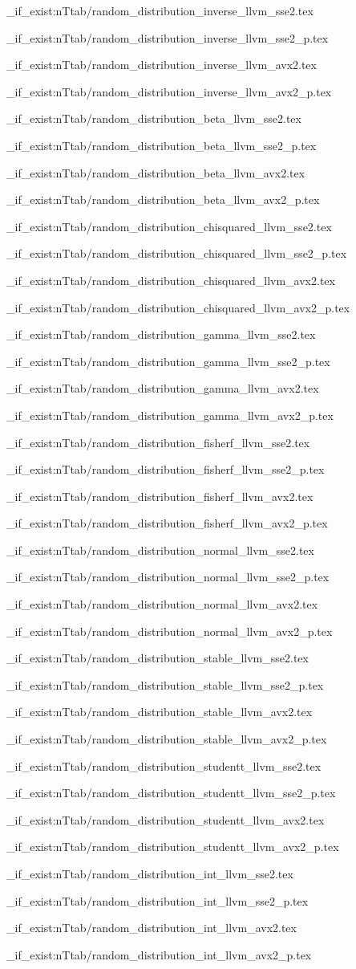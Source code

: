 \ExplSyntaxOn
\def\distributiontable#1#2#3{
  \file_if_exist:nT{tab/random_distribution_#1_llvm_sse2.tex}{
    \begin{table}
      
      \caption{Performance~of~#2~(Nehalem,~sequential)}
      \label{tab:Performance~of~#3~(Nehalem,~sequential)}
    \end{table}
  }
  \file_if_exist:nT{tab/random_distribution_#1_llvm_sse2_p.tex}{
    \begin{table}
      
      \caption{Performance~of~#2~(Nehalem,~parallel)}
      \label{tab:Performance~of~#3~(Nehalem,~parallel)}
    \end{table}
  }
  \file_if_exist:nT{tab/random_distribution_#1_llvm_avx2.tex}{
    \begin{table}
      
      \caption{Performance~of~#2~(Haswell,~sequential)}
      \label{tab:Performance~of~#3~(Haswell,~sequential)}
    \end{table}
  }
  \file_if_exist:nT{tab/random_distribution_#1_llvm_avx2_p.tex}{
    \begin{table}
      
      \caption{Performance~of~#2~(Haswell,~parallel)}
      \label{tab:Performance~of~#3~(Haswell,~parallel)}
    \end{table}
  }
  \clearpage
}
\ExplSyntaxOff

\distributiontable{inverse}{distributions using the inverse method}{%
distributions using the inverse method}
\distributiontable{beta}{Beta distribution}{Beta distribution}
\distributiontable{chisquared}{$\chi^2$ distribution}{chi-squared distribution}
\distributiontable{gamma}{Gamma distribution}{Gamma distribution}
\distributiontable{fisherf}{Fisher's $F$-distribution}{Fisher's F-distribution}
\distributiontable{normal}{Normal and related distributions}{%
Normal and related distributions}
\distributiontable{stable}{Stable distribution}{Stable distribution}
\distributiontable{studentt}{Student's $t$-distribution}{%
Student's t-distribution}
\distributiontable{int}{discrete distributions}{discrete distributions}
